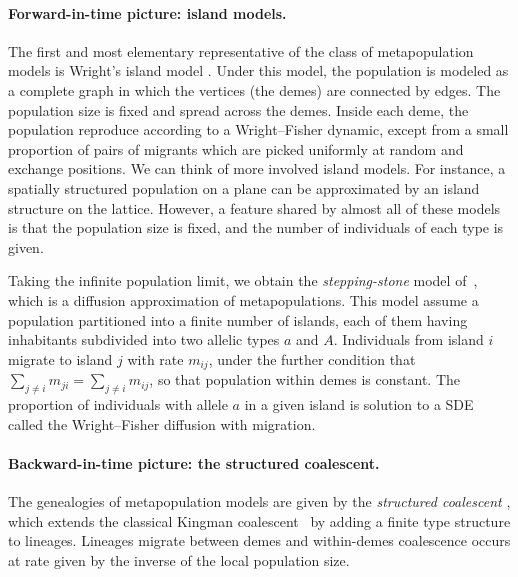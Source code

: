 \paragraph{Forward-in-time picture: island models.}
The first and most elementary representative of the class of metapopulation models is Wright's island model \cite{wright_isolation_1943}. Under this model, the population is modeled as a complete graph in which the vertices (the demes) are connected by edges. The population size is fixed and  spread across the demes. Inside each deme, the population reproduce according to a Wright--Fisher dynamic, except from a small proportion of pairs of migrants which are picked uniformly at random and exchange positions. 
We can think of more involved island models. For instance, a spatially structured population on a plane can be approximated by an island structure on the lattice.
However, a feature shared by almost all of
these models is that the population size is fixed, and the number of individuals of each type is given. 

Taking the infinite population limit, we obtain the \emph{stepping-stone} model of~\citet*{kimura_stepping_1964}, which is a diffusion approximation of metapopulations. This model assume a population partitioned into a finite number of islands, each of them having inhabitants subdivided into two allelic types $a$ and $A$. Individuals from island $i$ migrate to island $j$ with rate $m_{ij}$, under the further condition that $\sum_{j\neq i}m_{ji}=\sum_{j\neq i}m_{ij}$, so that population within demes is constant.
The proportion of individuals with allele $a$ in a given island is solution to a SDE called the Wright--Fisher diffusion with migration.


\paragraph{Backward-in-time picture: the structured coalescent.}

The genealogies of metapopulation models are given by the  \emph{structured coalescent}
\citet{takahata_coalescent_1988,notohara_coalescent_1990}, which extends the classical Kingman coalescent~\cite{Kingman:1982aa} by adding a finite type structure to lineages. Lineages migrate between demes and within-demes coalescence occurs at rate given by the inverse of the local population size. 

